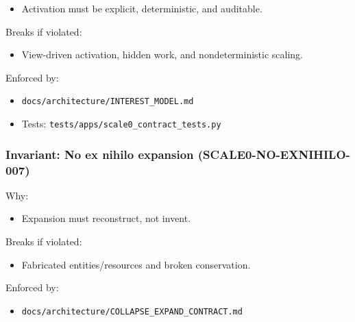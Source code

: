 \documentclass[9pt,a4paper,openany]{book}
\begin{document}
\begin{itemize}
\item Activation must be explicit, deterministic, and auditable.\allowbreak{}
\end{itemize}


Breaks if violated:



\begin{itemize}
\item View-\allowbreak{}driven activation, hidden work, and nondeterministic scaling.\allowbreak{}
\end{itemize}


Enforced by:



\begin{itemize}
\item \texttt{docs/\allowbreak{}architecture/\allowbreak{}INTEREST\_\allowbreak{}MODEL.\allowbreak{}md}
\end{itemize}


\begin{itemize}
\item Tests: \texttt{tests/\allowbreak{}apps/\allowbreak{}scale0\_\allowbreak{}contract\_\allowbreak{}tests.\allowbreak{}py}
\end{itemize}





\subsubsection{Invariant: No ex nihilo expansion (SCALE0-NO-EXNIHILO-007)}


Why:



\begin{itemize}
\item Expansion must reconstruct, not invent.\allowbreak{}
\end{itemize}


Breaks if violated:



\begin{itemize}
\item Fabricated entities/\allowbreak{}resources and broken conservation.\allowbreak{}
\end{itemize}


Enforced by:



\begin{itemize}
\item \texttt{docs/\allowbreak{}architecture/\allowbreak{}COLLAPSE\_\allowbreak{}EXPAND\_\allowbreak{}CONTRACT.\allowbreak{}md}
\end{itemize}
\end{document}
